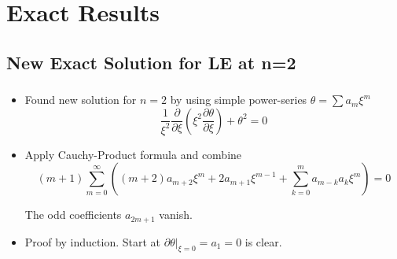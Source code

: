 \section{Exact Results}


\subsection{New Exact Solution for LE at n=2}
\begin{frame}
	\frametitle{\insertsubsection}
	\begin{itemize}[<+->]
		\item Found new solution for $n=2$ by using simple power-series $\theta=\sum a_m\xi^m$
		\begin{equation}
			\frac{1}{\xi^2}\frac{\partial}{\partial\xi}\left(\xi^2\frac{\partial\theta}{\partial\xi}\right) +\theta^2 =0
		\end{equation}
		\item Apply Cauchy-Product formula and combine
		\begin{equation}
			(m+1)\sum\limits_{m=0}^\infty\left((m+2)a_{m+2}\xi^{m}+2a_{m+1}\xi^{m-1} + \sum\limits_{k=0}^m a_{m-k}a_k\xi^m\right) = 0
		\end{equation}
		\begin{theorem}
			The odd coefficients $a_{2m+1}$ vanish.
		\end{theorem}
		\item Proof by induction. Start at $\left.\partial\theta\right|_{\xi=0}=a_1=0$ is clear.
	\end{itemize}
\end{frame}


